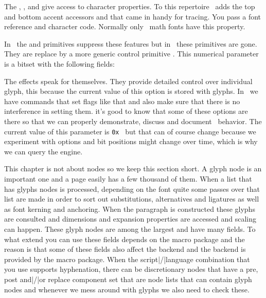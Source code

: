 {\stopsubsection

\startsubsection[title=Character properties]

The \type {\fontcharwd}, \type {\fontcharht}, \type {\fontchardp} and \type
{\fontcharic} give access to character properties. To this repertoire
\LUAMETATEX\ adds the top and bottom accent accessors \type {\fontcharta} and
\type {\fontcharba} that came in handy for tracing. You pass a font reference and
character code. Normally only \OPENTYPE\ math fonts have this property.

\stopsubsection

\startsubsection[title=Glyph options]

In \LUATEX\ the \type {\noligs} and \type {\nokerns} primitives suppress these
features but in \LUAMETATEX\ these primitives are gone. They are replace by a
more generic control primitive \type {\glyphoptions}. This numerical parameter is
a bitset with the following fields:

\startcolumns[n=2]
\stopcolumns

The effects speak for themselves. They provide detailed control over individual
glyph, this because the current value of this option is stored with glyphs. In
\CONTEXT\ we have commands that set flags like that and also make sure that there
is no interference in setting them. it's good to know that some of these options
are there so that we can properly demonstrate, discuss and document \LUAMETATEX\
behavior. The current value of this parameter is {\tt 0x\tohexadecimal
\glyphoptions} but that can of course change because we experiment with options
and bit positions might change over time, which is why we can query the engine.

\stopsubsection

\stopsection

\startsection[title={Nodes}]

This chapter is not about nodes so we keep this section short. A glyph node is an
important one and a page easily has a few thousand of them. When a list that has
glyphs nodes is processed, depending on the font quite some passes over that list
are made in order to sort out substitutions, alternatives and ligatures as well
as font kerning and anchoring. When the paragraph is constructed these glyphs are
consulted and dimensions and expansion properties are accessed and scaling can
happen. These glyph nodes are among the largest and have many fields. To what
extend you can use these fields depends on the macro package and the reason is
that some of these fields also affect the backend and the backend is provided by
the macro package. When the script|/|language combination that you use supports
hyphenation, there can be discretionary nodes that have a pre, post and|/|or
replace component set that are node lists that can contain glyph nodes and
whenever we mess around with glyphs we also need to check these.

}
